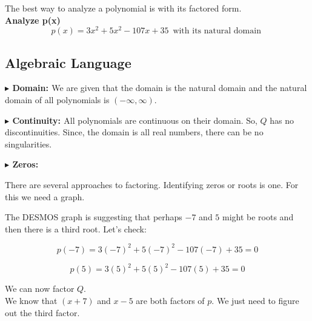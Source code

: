 \documentclass{ximera}
\author{Lee Wayand}
\begin{document}
\begin{exercise}



The best way to analyze a polynomial is with its factored form. \\


\textbf{Analyze p(x)} \\

\[
p(x) = 3 x^2 + 5 x^2 - 107 x + 35 \, \text { with its natural domain } 
\]






\subsection{Algebraic Language}



\textbf{\textcolor{blue!55!black}{$\blacktriangleright$ Domain: }} We are given that the domain is the natural domain and the natural domain of all polynomials is $(-\infty, \infty)$.


\textbf{\textcolor{blue!55!black}{$\blacktriangleright$ Continuity: }}  All polynomials are continuous on their domain.  So, $Q$ has no discontinuities.  Since, the domain is all real numbers, there can be no singularities.



\textbf{\textcolor{blue!55!black}{$\blacktriangleright$ Zeros: }}  


There are several approaches to factoring.  Identifying zeros or roots is one.  For this we need a graph.




\begin{center}
\end{center}



The DESMOS graph is suggesting that perhaps $-7$ and $5$ might be roots and then there is a third root.  Let's check:



\[
p(-7) = 3 (-7)^2 + 5 (-7)^2 - 107 (-7) + 35 = 0
\]



\[
p(5) = 3 (5)^2 + 5 (5)^2 - 107 (5) + 35 = 0
\]



We can now factor $Q$. \\


We know that $(x+7)$ and $x-5$ are both factors of $p$. We just need to figure out the third factor.





\end{exercise}
\end{document}
